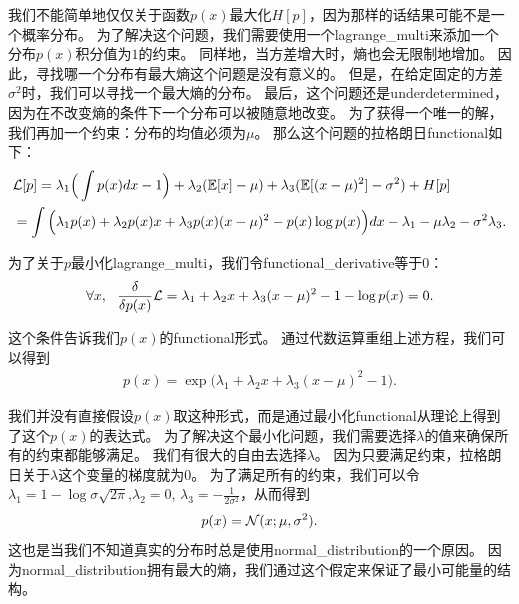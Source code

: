 我们不能简单地仅仅关于函数$p(x)$最大化$H[p]$，因为那样的话结果可能不是一个概率分布。
为了解决这个问题，我们需要使用一个\gls{lagrange_multi}来添加一个分布$p(x)$积分值为$1$的约束。
同样地，当方差增大时，熵也会无限制地增加。
因此，寻找哪一个分布有最大熵这个问题是没有意义的。
但是，在给定固定的方差$\sigma^2$时，我们可以寻找一个最大熵的分布。
最后，这个问题还是\gls{underdetermined}，因为在不改变熵的条件下一个分布可以被随意地改变。
为了获得一个唯一的解，我们再加一个约束：分布的均值必须为$\mu$。
那么这个问题的拉格朗日\gls{functional}如下：
\begin{align}
\label{eqn:1950}
&		\mathcal{L}[p] =  \lambda_1 \Big(\int p(x)dx - 1\Big)  + \lambda_2 (\mathbb{E}[x] - \mu) +  \lambda_3 (\mathbb{E}[(x-\mu)^2] - \sigma^2)  + H[p]\\
& =  \int \Big(\lambda_1 p(x) + \lambda_2 p(x)x + \lambda_3 p(x)(x-\mu)^2 - p(x)\log p(x) \Big)dx - \lambda_1 - \mu \lambda_2 - \sigma^2\lambda_3.
\end{align}


为了关于$p$最小化\gls{lagrange_multi}，我们令\gls{functional_derivative}等于$0$：
\begin{align}
\label{eqn:1952}
	\forall x,\ \  \frac{\delta}{\delta p(x)} \mathcal{L} = \lambda_1 + \lambda_2 x + \lambda_3(x-\mu)^2 - 1 - \log p(x) = 0 .
\end{align}


这个条件告诉我们$p(x)$的\gls{functional}形式。
通过代数运算重组上述方程，我们可以得到
\begin{align}
\label{eqn:1953}
	p(x) = \exp\big(\lambda_1 + \lambda_2 x + \lambda_3 (x-\mu)^2  - 1\big).
\end{align}


我们并没有直接假设$p(x)$取这种形式，而是通过最小化\gls{functional}从理论上得到了这个$p(x)$的表达式。
为了解决这个最小化问题，我们需要选择$\lambda$的值来确保所有的约束都能够满足。
我们有很大的自由去选择$\lambda$。
因为只要满足约束，拉格朗日关于$\lambda$这个变量的梯度就为$0$。
为了满足所有的约束，我们可以令$\lambda_1 = 1 - \log \sigma\sqrt{2\pi}$,$\lambda_2 = 0$, $\lambda_3 = - \frac{1}{2\sigma^2}$，从而得到
\begin{align}
\label{eqn:1954}
	p(x) = \mathcal{N}(x;\mu,\sigma^2).
\end{align}
这也是当我们不知道真实的分布时总是使用\gls{normal_distribution}的一个原因。
因为\gls{normal_distribution}拥有最大的熵，我们通过这个假定来保证了最小可能量的结构。



